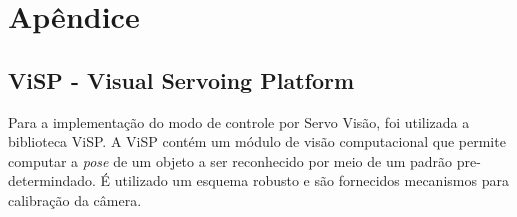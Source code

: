 \chapter{Apêndice}

\section{ViSP - Visual Servoing Platform}

Para a implementação do modo de controle por Servo Visão, foi utilizada a biblioteca ViSP. A ViSP contém um módulo de visão computacional que permite computar a \textit{pose} de um objeto a ser reconhecido por meio de um padrão pre-determindado. É utilizado um esquema robusto e são fornecidos mecanismos para calibração da câmera. 